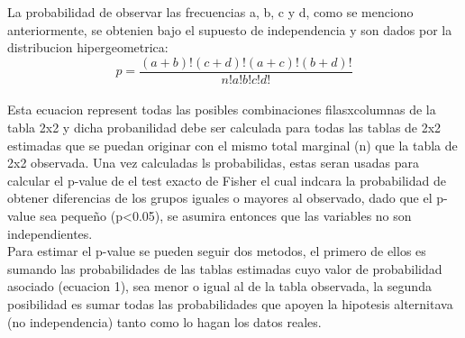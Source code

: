 \documentclass[12pt]{article}
\begin{document}
La probabilidad de observar las frecuencias a, b, c y d, como se menciono anteriormente, se obtenien bajo el supuesto de independencia y son dados por la distribucion hipergeometrica:\\

\begin{equation}
p=\frac{(a+b)!(c+d)!(a+c)!(b+d)!}{n!a!b!c!d!}
\end{equation}
\\
Esta ecuacion represent todas las posibles combinaciones filasxcolumnas de la tabla 2x2 y dicha probanilidad debe ser calculada para todas las tablas de 2x2 estimadas que se puedan originar con el mismo total marginal (n) que la tabla de 2x2 observada. Una vez calculadas ls probabilidas, estas seran usadas para calcular el p-value de el test exacto de Fisher el cual indcara la probabilidad de obtener diferencias de los grupos iguales o mayores al observado, dado que el p-value sea pequeño (p<0.05), se asumira entonces que las variables no son independientes.\\

Para estimar el p-value se pueden seguir dos metodos, el primero de ellos es sumando las probabilidades de las tablas estimadas cuyo valor de probabilidad asociado (ecuacion 1), sea menor o igual al de la tabla observada, la segunda posibilidad es sumar todas las probabilidades que apoyen la hipotesis alternitava (no independencia) tanto como lo hagan los datos reales.
\end{document}

